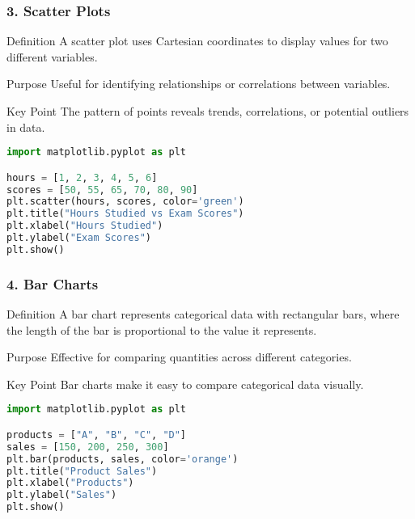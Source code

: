 \documentclass[aspectratio=169]{beamer}
\begin{document}
\begin{frame}[fragile]
    \frametitle{3. Scatter Plots}
    \begin{block}{Definition}
        A scatter plot uses Cartesian coordinates to display values for two different variables.
    \end{block}
    \begin{block}{Purpose}
        Useful for identifying relationships or correlations between variables.
    \end{block}
    \begin{block}{Key Point}
        The pattern of points reveals trends, correlations, or potential outliers in data.
    \end{block}
    \begin{lstlisting}[language=Python]
import matplotlib.pyplot as plt

hours = [1, 2, 3, 4, 5, 6]
scores = [50, 55, 65, 70, 80, 90]
plt.scatter(hours, scores, color='green')
plt.title("Hours Studied vs Exam Scores")
plt.xlabel("Hours Studied")
plt.ylabel("Exam Scores")
plt.show()
    \end{lstlisting}
\end{frame}

\begin{frame}[fragile]
    \frametitle{4. Bar Charts}
    \begin{block}{Definition}
        A bar chart represents categorical data with rectangular bars, where the length of the bar is proportional to the value it represents.
    \end{block}
    \begin{block}{Purpose}
        Effective for comparing quantities across different categories.
    \end{block}
    \begin{block}{Key Point}
        Bar charts make it easy to compare categorical data visually.
    \end{block}
    \begin{lstlisting}[language=Python]
import matplotlib.pyplot as plt

products = ["A", "B", "C", "D"]
sales = [150, 200, 250, 300]
plt.bar(products, sales, color='orange')
plt.title("Product Sales")
plt.xlabel("Products")
plt.ylabel("Sales")
plt.show()
    \end{lstlisting}
\end{frame}
\end{document}
